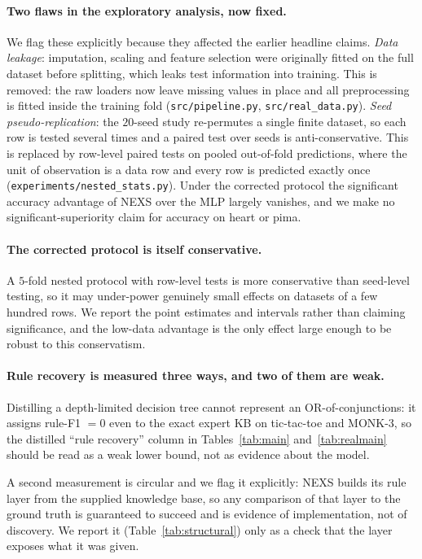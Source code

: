 \documentclass[11pt]{article}
\newcommand{\nexs}{\textsc{NEXS}}
\begin{document}
\paragraph{Two flaws in the exploratory analysis, now fixed.}
We flag these explicitly because they affected the earlier headline claims.
\emph{Data leakage}: imputation, scaling and feature selection were originally
fitted on the full dataset before splitting, which leaks test information into
training. This is removed: the raw loaders now leave missing values in place and
all preprocessing is fitted inside the training fold (\texttt{src/pipeline.py},
\texttt{src/real\_data.py}). \emph{Seed pseudo-replication}: the $20$-seed study
re-permutes a single finite dataset, so each row is tested several times and a
paired test over seeds is anti-conservative. This is replaced by row-level paired
tests on pooled out-of-fold predictions, where the unit of observation is a data
row and every row is predicted exactly once
(\texttt{experiments/nested\_stats.py}). Under the corrected protocol the
significant accuracy advantage of \nexs{} over the MLP largely vanishes, and we
make no significant-superiority claim for accuracy on heart or pima.

\paragraph{The corrected protocol is itself conservative.}
A $5$-fold nested protocol with row-level tests is more conservative than
seed-level testing, so it may under-power genuinely small effects on datasets of a
few hundred rows. We report the point estimates and intervals rather than
claiming significance, and the low-data advantage is the only effect large enough
to be robust to this conservatism.

\paragraph{Rule recovery is measured three ways, and two of them are weak.}
Distilling a depth-limited decision tree cannot represent an OR-of-conjunctions:
it assigns rule-F1 $=0$ even to the exact expert KB on tic-tac-toe and MONK-3, so
the distilled ``rule recovery'' column in Tables~\ref{tab:main}
and~\ref{tab:realmain} should be read as a weak lower bound, not as evidence
about the model.

A second measurement is circular and we flag it explicitly: \nexs{} builds its
rule layer from the supplied knowledge base, so any comparison of that layer to
the ground truth is guaranteed to succeed and is evidence of implementation, not
of discovery. We report it (Table~\ref{tab:structural}) only as a check that the
layer exposes what it was given.
\end{document}
